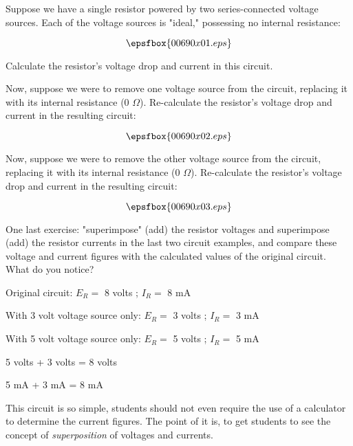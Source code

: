

Suppose we have a single resistor powered by two series-connected voltage sources.  Each of the voltage sources is "ideal," possessing no internal resistance:

$$\epsfbox{00690x01.eps}$$

Calculate the resistor's voltage drop and current in this circuit.

\vskip 10pt

Now, suppose we were to remove one voltage source from the circuit, replacing it with its internal resistance (0 $\Omega$).  Re-calculate the resistor's voltage drop and current in the resulting circuit:

$$\epsfbox{00690x02.eps}$$

\vskip 10pt

Now, suppose we were to remove the other voltage source from the circuit, replacing it with its internal resistance (0 $\Omega$).  Re-calculate the resistor's voltage drop and current in the resulting circuit:

$$\epsfbox{00690x03.eps}$$

\vskip 10pt

One last exercise: "superimpose" (add) the resistor voltages and superimpose (add) the resistor currents in the last two circuit examples, and compare these voltage and current figures with the calculated values of the original circuit.  What do you notice?







Original circuit: $E_R =$ 8 volts ; $I_R =$ 8 mA

\vskip 10pt

With 3 volt voltage source only: $E_R =$ 3 volts ; $I_R =$ 3 mA

\vskip 10pt

With 5 volt voltage source only: $E_R =$ 5 volts ; $I_R =$ 5 mA

\vskip 10pt

5 volts + 3 volts = 8 volts

5 mA + 3 mA = 8 mA







This circuit is so simple, students should not even require the use of a calculator to determine the current figures.  The point of it is, to get students to see the concept of {\it superposition} of voltages and currents.




